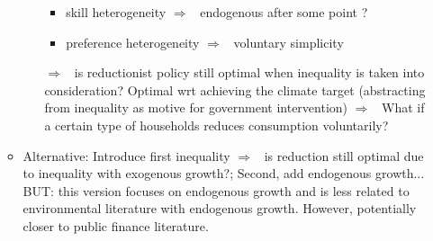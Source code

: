 \documentclass[12pt]{article}
\newcommand{\ar}{$\Rightarrow$ \ }
\begin{document}
\begin{itemize}
\begin{itemize}
\begin{enumerate}
\begin{itemize}
\item skill heterogeneity \ar endogenous after some point ?
\item preference heterogeneity \ar voluntary simplicity
\end{itemize}
\ar is reductionist policy still optimal when inequality is taken into consideration? Optimal wrt achieving the climate target (abstracting from inequality as motive for government intervention)
\ar What if a certain type of households reduces consumption voluntarily?
\end{enumerate}
\item Alternative: Introduce first inequality \ar is reduction still optimal due to inequality with exogenous growth?; Second, add endogenous growth... BUT: this version focuses on endogenous growth and is less related to environmental literature with endogenous growth. However, potentially closer to public finance literature.
\end{itemize}
\end{itemize} 
\end{document}
